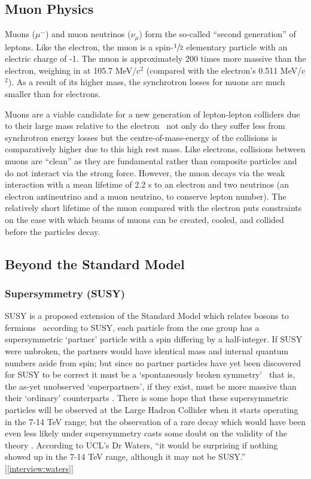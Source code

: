 \subsection{Muon Physics}
Muons ($\mu^{-}$) and muon neutrinos ($\nu_{\mu}$) form the so-called ``second generation'' of leptons. Like the electron, the muon is a spin-$\sfrac{1}{2}$ elementary particle with an electric charge of -1. The muon is approximately 200 times more massive than the electron, weighing in at 105.7 MeV/c$^{2}$ (compared with the electron's 0.511 MeV/c$^{2}$). As a result of its higher mass, the synchrotron losses for muons are much smaller than for electrons.

Muons are a viable candidate for a new generation of lepton-lepton colliders due to their large mass relative to the electron \textemdash \, not only do they suffer less from synchrotron energy losses but the centre-of-mass-energy of the collisions is comparatively higher due to this high rest mass. Like electrons, collisions between muons are ``clean'' as they are fundamental rather than composite particles and do not interact via the strong force. However,  the muon decays via the weak interaction with a mean lifetime of 2.2 \textmu s to an electron and two neutrinos (an electron antineutrino and a muon neutrino, to conserve lepton number). The relatively short lifetime of the muon compared with the electron puts constraints on the ease with which beams of muons can be created, cooled, and collided before the particles decay.

\subsection{Beyond the Standard Model}
\subsubsection{Supersymmetry (SUSY)}
SUSY is a proposed extension of the Standard Model which relates bosons to fermions \textemdash \,  according to SUSY, each particle from the one group has a supersymmetric ‘partner' particle with a spin differing by a half-integer. If SUSY were unbroken, the partners would have identical mass and internal quantum numbers aside from spin; but since no partner particles have yet been discovered for SUSY to be correct it must be a `spontaneously broken symmetry' \textemdash \, that is, the as-yet unobserved `superpartners', if they exist, must be more massive than their `ordinary' counterparts \cite{CERN:Supersymmetry}. There is some hope that these supersymmetric particles will be observed at the Large Hadron Collider when it starts operating in the 7-14 TeV range; but the observation of a rare decay which would have been even less likely under supersymmetry casts some doubt on the validity of the theory \cite{BBC:SUSY}. According to UCL's Dr Waters, ``it would be surprising if nothing showed up in the 7-14 TeV range, although it may not be SUSY.'' [\ref{interview:waters}]

